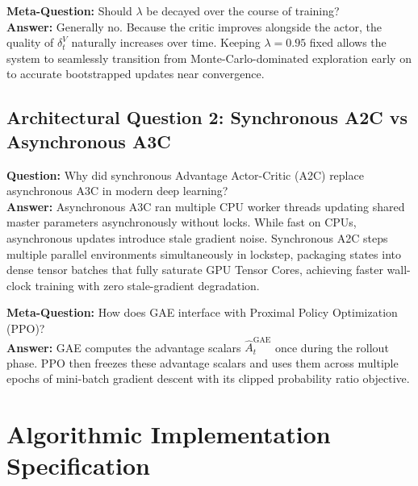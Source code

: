 \documentclass[11pt,a4paper]{article}
\theoremstyle{definition}
\begin{document}
\textbf{Meta-Question:} Should $\lambda$ be decayed over the course of training?\\
\textbf{Answer:} Generally no. Because the critic improves alongside the actor, the quality of $\delta_t^V$ naturally increases over time. Keeping $\lambda = 0.95$ fixed allows the system to seamlessly transition from Monte-Carlo-dominated exploration early on to accurate bootstrapped updates near convergence.

\subsection{Architectural Question 2: Synchronous A2C vs Asynchronous A3C}
\textbf{Question:} Why did synchronous Advantage Actor-Critic (A2C) replace asynchronous A3C in modern deep learning?\\
\textbf{Answer:} Asynchronous A3C ran multiple CPU worker threads updating shared master parameters asynchronously without locks. While fast on CPUs, asynchronous updates introduce stale gradient noise. Synchronous A2C steps multiple parallel environments simultaneously in lockstep, packaging states into dense tensor batches that fully saturate GPU Tensor Cores, achieving faster wall-clock training with zero stale-gradient degradation.

\textbf{Meta-Question:} How does GAE interface with Proximal Policy Optimization (PPO)?\\
\textbf{Answer:} GAE computes the advantage scalars $\widehat{A}_t^{\text{GAE}}$ once during the rollout phase. PPO then freezes these advantage scalars and uses them across multiple epochs of mini-batch gradient descent with its clipped probability ratio objective.

\section{Algorithmic Implementation Specification}
\end{document}
